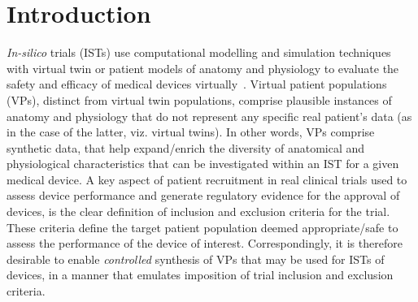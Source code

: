 \documentclass[runningheads]{llncs}
\begin{document}
\section{Introduction}
\textit{In-silico} trials (ISTs) use computational modelling and simulation techniques with virtual twin or patient models of anatomy and physiology to evaluate the safety and efficacy of medical devices virtually~\cite{viceconti2021silico}. Virtual patient populations (VPs), distinct from virtual twin populations, comprise plausible instances of anatomy and physiology that do not represent any specific real patient's data (as in the case of the latter, viz. virtual twins). In other words, VPs comprise synthetic data, that help expand/enrich the diversity of anatomical and physiological characteristics that can be investigated within an IST for a given medical device. %
A key aspect of patient recruitment in real clinical trials used to assess device performance and generate regulatory evidence for the approval of devices, is the clear definition of inclusion and exclusion criteria for the trial. These criteria define the target patient population deemed appropriate/safe to assess the performance of the device of interest. Correspondingly, it is therefore desirable to enable \textit{controlled} synthesis of VPs that may be used for ISTs of devices, in a manner that emulates imposition of trial inclusion and exclusion criteria. %

\end{document}
